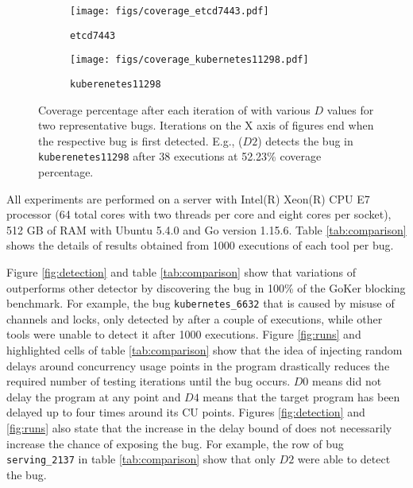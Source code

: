 \begin{figure*}
     \centering
     \begin{subfigure}[b]{0.46\textwidth}
        \centering
        \texttt{[image: figs/coverage\_etcd7443.pdf]}
        \caption{\texttt{etcd7443}}
        \label{fig:etcd_coverage}
     \end{subfigure}
     \hfill
     \begin{subfigure}[b]{0.46\textwidth}
       \centering
       \texttt{[image: figs/coverage\_kubernetes11298.pdf]}
       \caption{\texttt{kuberenetes11298}}
       \label{fig:kubernetes_coverage}
     \end{subfigure}
        \caption{Coverage percentage after each iteration of \goat with various $D$ values for two representative bugs. Iterations on the X axis of figures end when the respective bug is first detected. E.g., \goat($D2$) detects the bug in \texttt{kuberenetes11298} after 38 executions at 52.23\% coverage percentage.}
        \label{fig:coverage}
\end{figure*}



All experiments are performed on a server with Intel(R) Xeon(R) CPU E7 processor (64 total cores with two threads per core and eight cores per socket), 512 GB of RAM with Ubuntu 5.4.0 and Go version 1.15.6.
%
Table \ref{tab:comparison} shows the details of results obtained from 1000 executions of each tool per bug.
%

%


%
Figure \ref{fig:detection} and table \ref{tab:comparison} show that variations of \goat outperforms other detector by discovering the bug in 100\% of the GoKer blocking benchmark.
%
For example, the bug \texttt{kubernetes\_6632} that is caused by misuse of channels and locks, only detected by \goat after a couple of executions, while other tools were unable to detect it after 1000 executions.
%
Figure \ref{fig:runs} and highlighted cells of table \ref{tab:comparison} show that the idea of injecting random delays around concurrency usage points in the program drastically reduces the required number of testing iterations until the bug occurs.
%
$D0$ means \goat did not delay the program at any point and $D4$ means that the target program has been delayed up to four times around its CU points.
%
Figures \ref{fig:detection} and \ref{fig:runs} also state that the increase in the delay bound of \goat does not necessarily increase the chance of exposing the bug.
%
For example, the row of bug \texttt{serving\_2137} in table \ref{tab:comparison} show that only \goat $D2$ were able to detect the bug.




